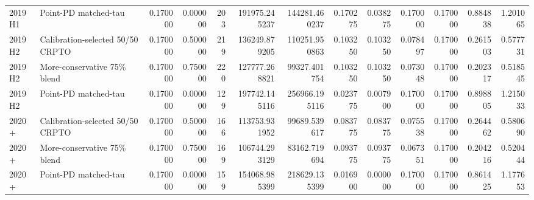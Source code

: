 \begin{tabular}{llrrrrrrrrrrr}
2019H1 & Point-PD matched-tau & 0.170000 & 0.000000 & 203 & 191975.245237 & 144281.460237 & 0.170275 & 0.038275 & 0.170000 & 0.170000 & 0.884838 & 1.201065 \\
2019H2 & Calibration-selected 50/50 CRPTO & 0.170000 & 0.500000 & 219 & 136249.879205 & 110251.950863 & 0.103250 & 0.103250 & 0.078497 & 0.170000 & 0.261503 & 0.577731 \\
2019H2 & More-conservative 75\% blend & 0.170000 & 0.750000 & 220 & 127777.268821 & 99327.401754 & 0.103250 & 0.103250 & 0.073048 & 0.170000 & 0.202317 & 0.518545 \\
2019H2 & Point-PD matched-tau & 0.170000 & 0.000000 & 129 & 197742.145116 & 256966.195116 & 0.023775 & 0.007900 & 0.170000 & 0.170000 & 0.898805 & 1.215033 \\
2020+ & Calibration-selected 50/50 CRPTO & 0.170000 & 0.500000 & 166 & 113753.931952 & 99689.539617 & 0.083775 & 0.083775 & 0.075538 & 0.170000 & 0.264462 & 0.580690 \\
2020+ & More-conservative 75\% blend & 0.170000 & 0.750000 & 169 & 106744.293129 & 83162.719694 & 0.093775 & 0.093775 & 0.067351 & 0.170000 & 0.204216 & 0.520444 \\
2020+ & Point-PD matched-tau & 0.170000 & 0.000000 & 159 & 154068.985399 & 218629.135399 & 0.016900 & 0.000000 & 0.170000 & 0.170000 & 0.861425 & 1.177653 \\
\bottomrule
\end{tabular}
